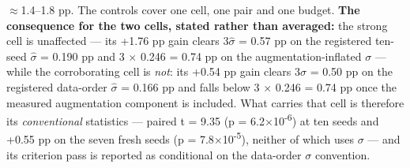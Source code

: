 \documentclass[pdflatex,sn-mathphys-ay]{sn-jnl}
\begin{document}
\ensuremath{\approx}1.4--1.8 pp. The controls cover one cell, one pair and one budget. \textbf{The consequence for the two cells, stated rather than averaged:} the strong cell is unaffected --- its +1.76 pp gain clears 3$\hat{\sigma}$ = 0.57 pp on the registered ten-seed $\hat{\sigma}$ = 0.190 pp and 3 \ensuremath{\times} 0.246 = 0.74 pp on the augmentation-inflated \ensuremath{\sigma} --- while the corroborating cell is \emph{not}: its +0.54 pp gain clears 3$\hat{\sigma}$ = 0.50 pp on the registered data-order $\hat{\sigma}$ = 0.166 pp and falls below 3 \ensuremath{\times} 0.246 = 0.74 pp once the measured augmentation component is included. What carries that cell is therefore its \emph{conventional} statistics --- paired t = 9.35 (p = 6.2\ensuremath{\times}10\textsuperscript{-6}) at ten seeds and +0.55 pp on the seven fresh seeds (p = 7.8\ensuremath{\times}10\textsuperscript{-5}), neither of which uses \ensuremath{\sigma} --- and its criterion pass is reported as conditional on the data-order \ensuremath{\sigma} convention.
\end{document}
